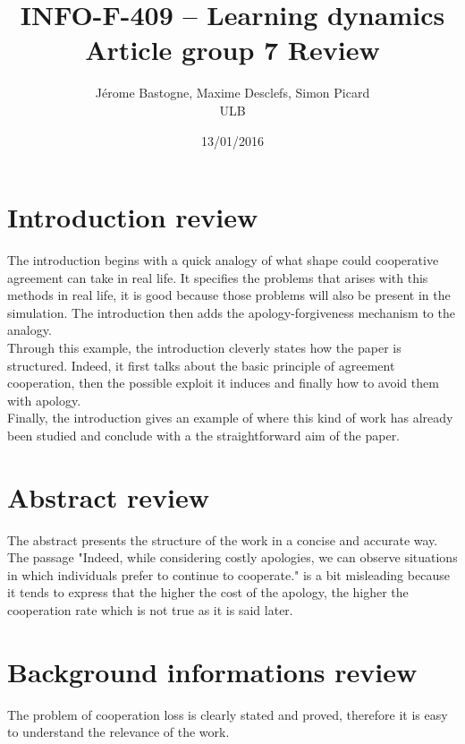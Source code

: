 \documentclass{article}
\title{INFO-F-409 -- Learning dynamics\\Article group 7 Review}
\date{13/01/2016}
\author{Jérome Bastogne, Maxime Desclefs, Simon Picard\\\textsc{ULB}}
\begin{document}
\maketitle

\section{Introduction review}
The introduction begins with a quick analogy of what shape could cooperative agreement can take in real life. It specifies the problems that arises with this methods in real life, it is good because those problems will also be present in the simulation. The introduction then adds the apology-forgiveness mechanism to the analogy.\\
Through this example, the introduction cleverly states how the paper is structured. Indeed, it first talks about the basic principle of agreement cooperation, then the possible exploit it induces and finally how to avoid them with apology.\\
Finally, the introduction gives an example of where this kind of work has already been studied and conclude with a the straightforward aim of the paper.\\


\section{Abstract review}
The abstract presents the structure of the work in a concise and accurate way. The passage "Indeed, while considering costly apologies, we can observe situations in which individuals prefer to continue to cooperate." is a bit misleading because it tends to express that the higher the cost of the apology, the higher the cooperation rate which is not true as it is said later.


\section{Background informations review}
The problem of cooperation loss is clearly stated and proved, therefore it is easy to understand the relevance of the work.
\end{document}
